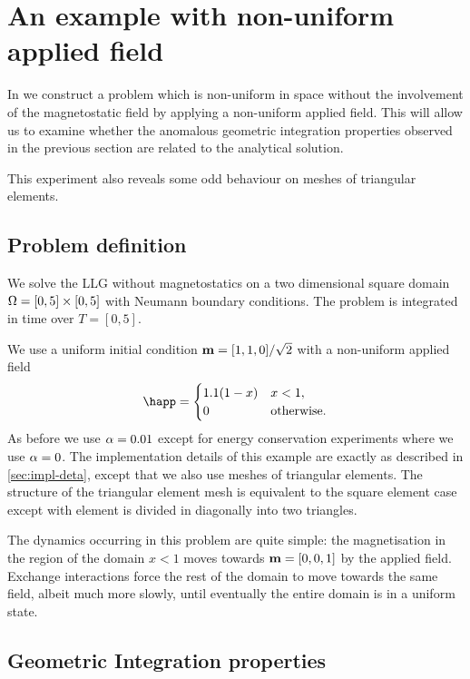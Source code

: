 \FloatBarrier
\section{An example with non-uniform applied field}
\label{sec:non-uniform-applied}

In  we construct a problem which is non-uniform in space without the involvement of the magnetostatic field by applying a non-uniform applied field.
This will allow us to examine whether the anomalous geometric integration properties observed in the previous section are related to the analytical solution.

This experiment also reveals some odd behaviour on meshes of triangular elements.

\subsection{Problem definition}

We solve the LLG without magnetostatics on a two dimensional square domain $\Omega = [0,5] \times [0,5]$ with Neumann boundary conditions.
The problem is integrated in time over $T = [0, 5]$.

We use a uniform initial condition $\boldsymbol{\mathrm{m}} = [1, 1, 0]/\sqrt{2}$ with a non-uniform applied field
\begin{equation}
  \happ =
  \begin{cases}
    1.1 (1 -  x) & x  < 1, \\
    0 & \mathrm{otherwise}.
  \end{cases}
\end{equation}
As before we use $\alpha = 0.01$ except for energy conservation experiments where we use $\alpha = 0$.
The implementation details of this example are exactly as described in \cref{sec:impl-deta}, except that we also use meshes of triangular elements.
The structure of the triangular element mesh is equivalent to the square element case except with element is divided in diagonally into two triangles.

The dynamics occurring in this problem are quite simple: the magnetisation in the region of the domain $x<1$ moves towards $\boldsymbol{\mathrm{m}} = [0, 0, 1]$ by the applied field.
Exchange interactions force the rest of the domain to move towards the same field, albeit much more slowly, until eventually the entire domain is in a uniform state.


\subsection{Geometric Integration properties}


